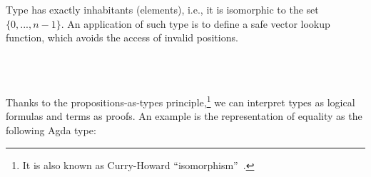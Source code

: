 \documentclass[sigconf]{acmart}
\begin{document}
\begin{code}%
%
\>[2]\AgdaSpace{}%
\AgdaSpace{}%
\AgdaSymbol{:}\AgdaSpace{}%
\AgdaSpace{}%
\AgdaSpace{}%
\AgdaSpace{}%
\<%
\\
\>[2][@{}l@{\AgdaIndent{0}}]%
\>[4]\AgdaSpace{}%
\AgdaSymbol{:}\AgdaSpace{}%
\AgdaSpace{}%
\AgdaSymbol{\{}\AgdaSymbol{\}}\AgdaSpace{}%
\AgdaSpace{}%
\AgdaSpace{}%
\AgdaSymbol{(}\AgdaSpace{}%
\AgdaSymbol{)}\<%
\\
%
\>[4]\AgdaSpace{}%
\AgdaSymbol{:}\AgdaSpace{}%
\AgdaSpace{}%
\AgdaSymbol{\{}\AgdaSymbol{\}}\AgdaSpace{}%
\AgdaSpace{}%
\AgdaSpace{}%
\AgdaSpace{}%
\AgdaSpace{}%
\AgdaSpace{}%
\AgdaSymbol{(}\AgdaSpace{}%
\AgdaSymbol{)}\<%
\end{code}
Type  has exactly  inhabitants
(elements), i.e., it is isomorphic to the set $\{0,...,n - 1\}$.
An application of such type is to define a safe vector
lookup function, which avoids the access of invalid positions.
\begin{code}%
%
\>[2]\AgdaSpace{}%
\AgdaSymbol{:}\AgdaSpace{}%
\AgdaSpace{}%
\AgdaSymbol{\{}\AgdaSpace{}%
\AgdaSymbol{\}}\AgdaSpace{}%
\AgdaSpace{}%
\AgdaSpace{}%
\AgdaSpace{}%
\AgdaSpace{}%
\AgdaSpace{}%
\AgdaSpace{}%
\AgdaSpace{}%
\AgdaSpace{}%
\<%
\\
%
\>[2]\AgdaSpace{}%
\AgdaSpace{}%
\AgdaSymbol{(}\AgdaSpace{}%
\AgdaSpace{}%
\AgdaSymbol{\AgdaUnderscore{})}\AgdaSpace{}%
\AgdaSymbol{=}\AgdaSpace{}%
\<%
\\
%
\>[2]\AgdaSpace{}%
\AgdaSymbol{(}\AgdaSpace{}%
\AgdaSymbol{)}\AgdaSpace{}%
\AgdaSymbol{(\AgdaUnderscore{}}\AgdaSpace{}%
\AgdaSpace{}%
\AgdaSymbol{)}\AgdaSpace{}%
\AgdaSymbol{=}\AgdaSpace{}%
\AgdaSpace{}%
\AgdaSpace{}%
\<%
\end{code}
Thanks to the propositions-as-types principle,\footnote{It is also known as
  Curry-Howard ``isomorphism''~\cite{Sorensen2006}.} we can interpret
types as logical formulas and terms as proofs. An example is the
representation of equality as the following Agda type:
\end{document}
